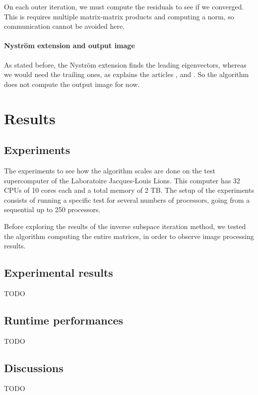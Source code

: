 On each outer iteration, we must compute the residuals to see if we converged.
This is requires multiple matrix-matrix products and computing a norm, so communication cannot be avoided here.

\paragraph{Nystr\"om extension and output image}
As stated before, the Nystr\"om extension finds the leading eigenvectors, whereas we would need the trailing ones, as explains the articles \cite{belongie_spectral_2002}, \cite{fowlkes_spectral_2004} and \cite{glide_2014}.
So the algorithm does not compute the output image for now.

\section{Results}

\subsection{Experiments}

The experiments to see how the algorithm scales are done on the test supercomputer of the Laboratoire Jacques-Louis Lions.
This computer has 32 CPUs of 10 cores each and a total memory of 2 TB.
The setup of the experiments consists of running a specific test for several numbers of processors, going from a sequential up to 250 processors.

Before exploring the results of the inverse subspace iteration method, we tested the algorithm computing the entire matrices, in order to observe image processing results.

\subsection{Experimental results}
TODO

\subsection{Runtime performances}
TODO

\subsection{Discussions}
TODO
